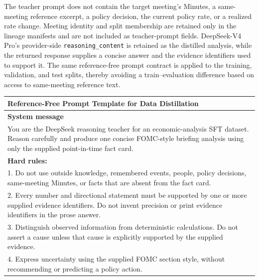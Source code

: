 The teacher prompt does not contain the target meeting's Minutes, a same-meeting reference excerpt, a policy decision, the current policy rate, or a realized rate change. Meeting identity and split membership are retained only in the lineage manifests and are not included as teacher-prompt fields. DeepSeek-V4 Pro's provider-side \texttt{reasoning\_content} is retained as the distilled analysis, while the returned response supplies a concise answer and the evidence identifiers used to support it. The same reference-free prompt contract is applied to the training, validation, and test splits, thereby avoiding a train--evaluation difference based on access to same-meeting reference text. 


\begin{table}[htbp]
    \centering
    \scriptsize
    \setlength{\tabcolsep}{6pt}
    \renewcommand{\arraystretch}{1.12}

    \begin{tabular}{@{}p{}@{}}
        \toprule
        \textbf{Reference-Free Prompt Template for Data Distillation} \\
        \midrule

        \textbf{System message} \\[2pt]

        You are the DeepSeek reasoning teacher for an economic-analysis SFT
        dataset. Reason carefully and produce one concise FOMC-style briefing
        analysis using only the supplied point-in-time fact card. \\[4pt]

        \textbf{Hard rules:} \\

        1. Do not use outside knowledge, remembered events, people, policy
        decisions, same-meeting Minutes, or facts that are absent from the fact
        card. \\

        2. Every number and directional statement must be supported by one or
        more supplied evidence identifiers. Do not invent precision or print
        evidence identifiers in the prose answer. \\

        3. Distinguish observed information from deterministic calculations.
        Do not assert a cause unless that cause is explicitly supported by the
        supplied evidence. \\

        4. Express uncertainty using the supplied FOMC section style, without
        recommending or predicting a policy action. \\


\end{tabular}
\end{table}
